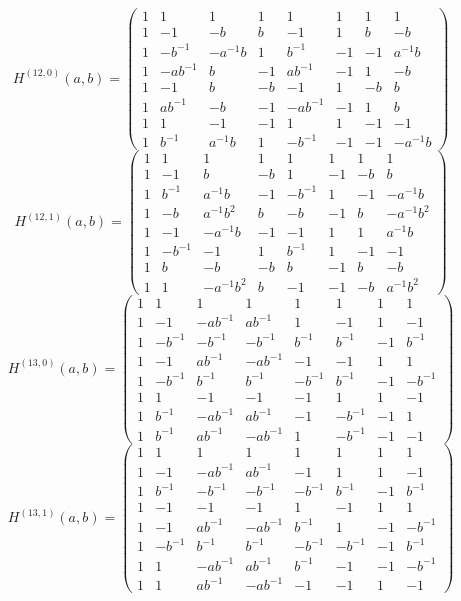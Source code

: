 \documentclass[11pt,a4paper]{article}
\theoremstyle{plain}
\theoremstyle{definition}
\numberwithin{equation}{section}
\begin{document}
\medskip
{\small\setlength{\arraycolsep}{5pt}$$H^{(12,0)}(a,b)=
\begin{pmatrix}
1&1&1&1&1&1&1&1\\1&-1&-b&b&-1&1&b&-b\\1&-b^{-1}&-a^{-1}b&1&b^{-1}&-1&-1&a^{-1}b\\1&-ab^{-1}&b&-1&ab^{-1}&-1&1&-b\\1&-1&b&-b&-1&1&-b&b\\1&ab^{-1}&-b&-1&-ab^{-1}&-1&1&b\\1&1&-1&-1&1&1&-1&-1\\1&b^{-1}&a^{-1}b&1&-b^{-1}&-1&-1&-a^{-1}b
\end{pmatrix}$$}
\medskip
{\small\setlength{\arraycolsep}{5pt}$$H^{(12,1)}(a,b)=
\begin{pmatrix}
1&1&1&1&1&1&1&1\\1&-1&b&-b&1&-1&-b&b\\1&b^{-1}&a^{-1}b&-1&-b^{-1}&1&-1&-a^{-1}b\\1&-b&a^{-1}b^{2}&b&-b&-1&b&-a^{-1}b^{2}\\1&-1&-a^{-1}b&-1&-1&1&1&a^{-1}b\\1&-b^{-1}&-1&1&b^{-1}&1&-1&-1\\1&b&-b&-b&b&-1&b&-b\\1&1&-a^{-1}b^{2}&b&-1&-1&-b&a^{-1}b^{2}
\end{pmatrix}$$}
\medskip
{\small\setlength{\arraycolsep}{5pt}$$H^{(13,0)}(a,b)=
\begin{pmatrix}
1&1&1&1&1&1&1&1\\1&-1&-ab^{-1}&ab^{-1}&1&-1&1&-1\\1&-b^{-1}&-b^{-1}&-b^{-1}&b^{-1}&b^{-1}&-1&b^{-1}\\1&-1&ab^{-1}&-ab^{-1}&-1&-1&1&1\\1&-b^{-1}&b^{-1}&b^{-1}&-b^{-1}&b^{-1}&-1&-b^{-1}\\1&1&-1&-1&-1&1&1&-1\\1&b^{-1}&-ab^{-1}&ab^{-1}&-1&-b^{-1}&-1&1\\1&b^{-1}&ab^{-1}&-ab^{-1}&1&-b^{-1}&-1&-1
\end{pmatrix}$$}
\medskip
{\small\setlength{\arraycolsep}{5pt}$$H^{(13,1)}(a,b)=
\begin{pmatrix}
1&1&1&1&1&1&1&1\\1&-1&-ab^{-1}&ab^{-1}&-1&1&1&-1\\1&b^{-1}&-b^{-1}&-b^{-1}&-b^{-1}&b^{-1}&-1&b^{-1}\\1&-1&-1&-1&1&-1&1&1\\1&-1&ab^{-1}&-ab^{-1}&b^{-1}&1&-1&-b^{-1}\\1&-b^{-1}&b^{-1}&b^{-1}&-b^{-1}&-b^{-1}&-1&b^{-1}\\1&1&-ab^{-1}&ab^{-1}&b^{-1}&-1&-1&-b^{-1}\\1&1&ab^{-1}&-ab^{-1}&-1&-1&1&-1
\end{pmatrix}$$}
\end{document}
